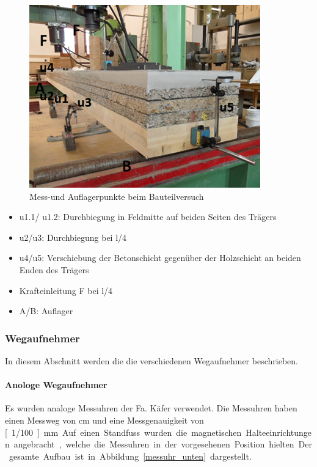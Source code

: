 \begin{figure}[h!]
\begin{center}
	\includegraphics[scale=1.3]{Versuchsaufbau/messpunkte.png}
	\caption{Mess-und Auflagerpunkte beim Bauteilversuch}
	\label{messpunkte}
\end{center}
\end{figure}

	\begin{itemize}
	\item u1.1/ u1.2: Durchbiegung in Feldmitte 	auf beiden Seiten des Trägers
	\item u2/u3: Durchbiegung bei l/4
	\item u4/u5: Verschiebung der Betonschicht 	gegenüber der Holzschicht an beiden 	Enden des Trägers
	\item  Krafteinleitung F bei l/4
	\item A/B: Auflager
	\end{itemize}





\subsubsection{Wegaufnehmer}	

In diesem Abschnitt werden die die verschiedenen Wegaufnehmer beschrieben.

\paragraph{Anologe Wegaufnehmer}

Es wurden analoge Messuhren der Fa. Käfer verwendet. Die Messuhren haben einen Messweg von \unit[7]{cm} und  eine Messgenauigkeit von  \unit[1/100]{mm}.  Auf einen Standfuss wurden die magnetischen Halteeinrichtungen angebracht, welche die Messuhren in der vorgesehenen Position hielten. Der gesamte Aufbau ist in Abbildung \ref{messuhr_unten} dargestellt.

